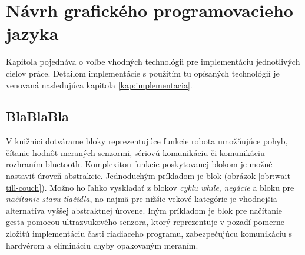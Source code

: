 \chapter{Návrh grafického programovacieho jazyka}
\label{kap:navrh-gpj}

Kapitola pojednáva o voľbe vhodných technológii pre implementáciu jednotlivých cieľov práce. Detailom implementácie s použitím tu opísaných technológií je venovaná nasledujúca kapitola \ref{kap:implementacia}.

\section{BlaBlaBla}

V knižnici dotvárame bloky reprezentujúce funkcie robota umožňujúce pohyb, čítanie hodnôt meraných senzormi, sériovú komunikáciu či komunikáciu rozhraním bluetooth. Komplexitou funkcie poskytovanej blokom je možné nastaviť úroveň abstrakcie. Jednoduchým príkladom je blok  (obrázok \ref{obr:wait-till-couch}). Možno ho ľahko vyskladať z blokov \textit{cyklu while}, \textit{negácie} a bloku pre \textit{načítanie stavu tlačidla}, no najmä pre nižšie vekové kategórie je vhodnejšia alternatíva vyššej abstraktnej úrovene. Iným príkladom je blok pre načítanie gesta pomocou ultrazvukového senzora, ktorý reprezentuje v pozadí pomerne zložitú implementáciu časti riadiaceho programu, zabezpečujúcu komunikáciu s hardvérom a elimináciu chyby opakovaným meraním.

